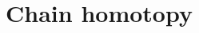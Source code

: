 \documentclass{ximera}
\title{Chain homotopy}
\begin{document}
\begin{abstract}

\end{abstract}
\maketitle

\end{document}
